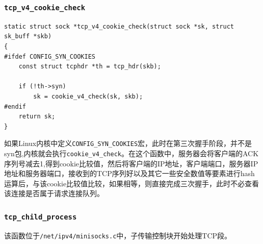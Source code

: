                \subsubsection{\texttt{tcp_v4_cookie_check}}

\begin{verbatim}
static struct sock *tcp_v4_cookie_check(struct sock *sk, struct sk_buff *skb)
{
#ifdef CONFIG_SYN_COOKIES
    const struct tcphdr *th = tcp_hdr(skb);

    if (!th->syn)
        sk = cookie_v4_check(sk, skb);
#endif
    return sk;
}
\end{verbatim}

                   如果Linux内核中定义\texttt{CONFIG_SYN_COOKIES}宏，此时在第三次握手阶段，并不是syn包,内核就会执行\texttt{cookie_v4_check}。在这个函数中，服务器会将客户端的ACK序列号减去1,得到cookie比较值，然后将客户端的IP地址，客户端端口，服务器IP地址和服务器端口，接收到的TCP序列好以及其它一些安全数值等要素进行hash运算后，与该cookie比较值比较，如果相等，则直接完成三次握手，此时不必查看该连接是否属于请求连接队列。

                \subsubsection{\texttt{tcp_child_process}}

                    该函数位于\texttt{/net/ipv4/minisocks.c}中，子传输控制块开始处理TCP段。

